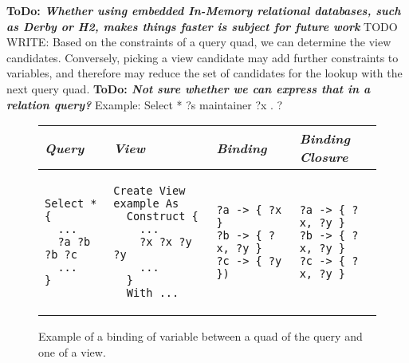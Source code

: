 \documentclass[a4paper,twoside,bibtotoc,abstracton,12pt,BCOR=15mm]{scrreprt}
\newcommand{\todo}[1]{\textbf{ToDo: \textit{#1}}}
\begin{document}
\todo{Whether using embedded In-Memory relational databases, such as Derby or H2, makes things faster is subject for future work}
TODO WRITE:
Based on the constraints of a query quad, we can determine the view candidates.
Conversely, picking a view candidate may add further constraints to variables, and therefore may reduce the set of
candidates for the lookup with the next query quad. 
\todo{Not sure whether we can express that in a relation query?}
Example: Select * { ?s maintainer ?x . ?}


\begin{figure}[!h]
\centering
\begin{tabular}{llll}
\toprule
\emph{Query} & \emph{View} & \emph{Binding} & \emph{Binding Closure} \\ 
\midrule

\begin{minipage}{3cm}
\begin{scriptsize}
\begin{verbatim}
Select * {
  ...
  ?a ?b ?b ?c
  ...
}
\end{verbatim}
\end{scriptsize}
\end{minipage}

&

\begin{minipage}{3cm}
\begin{scriptsize}
\begin{verbatim}
Create View example As
  Construct {
    ...
    ?x ?x ?y ?y
    ...
  }
  With ...
\end{verbatim}
\end{scriptsize}
\end{minipage}

&

\begin{minipage}{3cm}
\begin{scriptsize}
\begin{verbatim}
?a -> { ?x }
?b -> { ?x, ?y }
?c -> { ?y })
\end{verbatim}
\end{scriptsize}
\end{minipage}

&

\begin{minipage}{3cm}
\begin{scriptsize}
\begin{verbatim}
?a -> { ?x, ?y }
?b -> { ?x, ?y }
?c -> { ?x, ?y }
\end{verbatim}
\end{scriptsize}
\end{minipage}

\\

\bottomrule
\end{tabular}
\caption{Example of a binding of variable between a quad of the query and one of a view.}
\label{fig:binding-multimap}
\end{figure}
\end{document}
